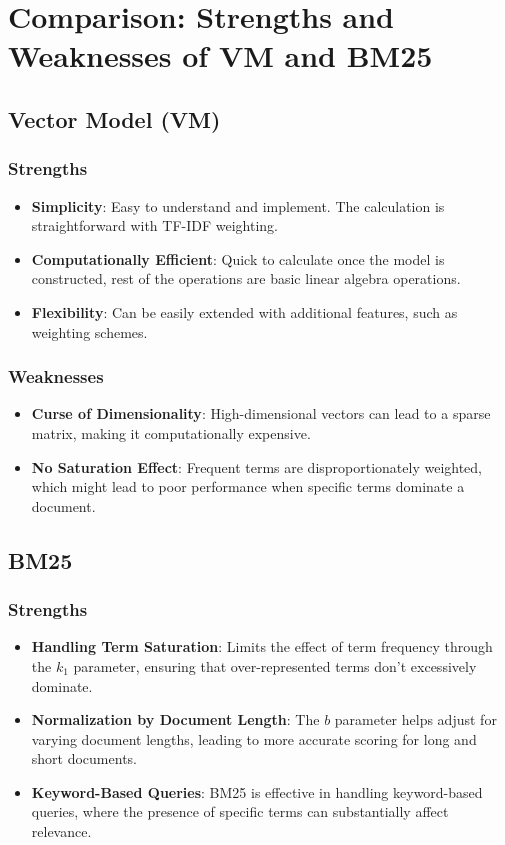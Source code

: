 \documentclass[12pt,letterpaper]{article}
\begin{document}
\section{Comparison: Strengths and Weaknesses of VM and BM25}
\subsection{Vector Model (VM)}
\subsubsection{Strengths}
\begin{itemize}
    \item \textbf{Simplicity}: Easy to understand and implement. The calculation is straightforward with TF-IDF weighting.
    \item \textbf{Computationally Efficient}: Quick to calculate once the model is constructed, rest of the operations are basic linear algebra operations. 
    \item \textbf{Flexibility}: Can be easily extended with additional features, such as weighting schemes.
\end{itemize}
\subsubsection{Weaknesses}
\begin{itemize}
    \item \textbf{Curse of Dimensionality}: High-dimensional vectors can lead to a sparse matrix, making it computationally expensive.
    \item \textbf{No Saturation Effect}: Frequent terms are disproportionately weighted, which might lead to poor performance when specific terms dominate a document.
\end{itemize}

\subsection{BM25}
\subsubsection{Strengths}
\begin{itemize}
    \item \textbf{Handling Term Saturation}: Limits the effect of term frequency through the \( k_1 \) parameter, ensuring that over-represented terms don’t excessively dominate.
    \item \textbf{Normalization by Document Length}: The \( b \) parameter helps adjust for varying document lengths, leading to more accurate scoring for long and short documents.
    \item \textbf{Keyword-Based Queries}: BM25 is effective in handling keyword-based queries, where the presence of specific terms can substantially affect relevance.
\end{itemize}
\end{document}
